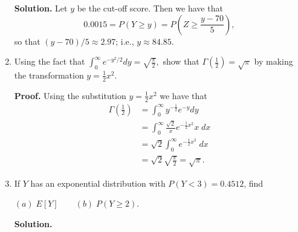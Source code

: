 \documentclass[9pt]{article}
\newcommand{\D}{\displaystyle}
\begin{document}
\begin{enumerate}
      \textbf{Solution.} Let $y$ be the cut-off score. Then we have that
      $$0.0015 = P(Y \ge y) = P\left(Z \ge \frac{y - 70}{5}\right),$$
      so that $(y-70)/5 \approx 2.97$; i.e., $y \approx 84.85$.
   \item Using the fact that
         $\D\int_0^\infty e^{-y^2/2} dy = \sqrt{\frac{\pi}{2}},$ show that
         $\D\Gamma\left(\frac{1}{2}\right) = \sqrt{\pi}$ by making the 
         transformation $y = \frac{1}{2} x^2$.

      \textbf{Proof.} Using the substitution $y = \frac{1}{2} x^2$ we have that
      \begin{align*}
         \Gamma\left(\frac{1}{2}\right) &=
            \int_0^\infty y^{-\frac{1}{2}}e^{-y} dy \\
         &= \int_0^\infty \frac{\sqrt{2}}{x} e^{-\frac{1}{2}x^2} x \; dx \\
         &= \sqrt{2}\int_0^\infty  e^{-\frac{1}{2}x^2} \; dx \\
         &= \sqrt{2} \sqrt{\frac{\pi}{2}} = \sqrt{\pi}.
      \end{align*}
   \item If $Y$ has an exponential distribution with $P(Y < 3) = 0.4512$, find

         $(a)\; E[Y] \qquad (b)\; P(Y \ge 2)$.

      \textbf{Solution.}


\end{enumerate}
\end{document}
